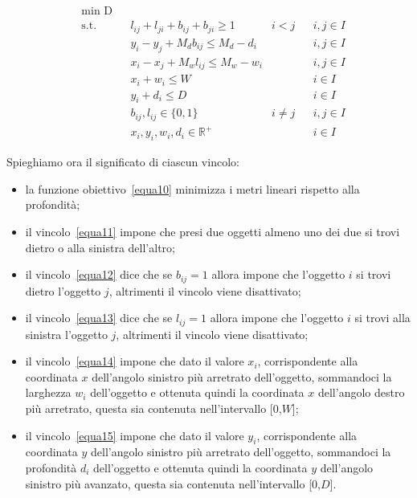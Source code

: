 \begin{align}
	& \underset{}{\text{min D}} \label{equa10}\\
	  & \text{s.t.} &   & l_{ij} + l_{ji} + b_{ij} + b_{ji} \geq 1      & i < j    &   & i,j \in I \label{equa11} \\
	  &             &   & y_i - y_j + M_d b_{ij} \leq M_d - d_i         &          &   & i,j \in I \label{equa12} \\
	  &             &   & x_i - x_j + M_w l_{ij} \leq M_w - w_i         &          &   & i,j \in I \label{equa13} \\
	  &             &   & x_i + w_i \leq W                              &          &   & i \in I   \label{equa14} \\
	  &             &   & y_i + d_i \leq D                              &          &   & i \in I   \label{equa15} \\
	  &             &   & b_{ij}, l_{ij} \in \{0,1\}                    & i \neq j &   & i,j \in I \label{equa16} \\
	  &             &   & x_{i}, y_{i}, w_{i}, d_{i} \in \mathbb{R}^{+} &          &   & i \in I  \label{equa17}  
\end{align}

Spieghiamo ora il significato di ciascun vincolo:
\begin{itemize}
	\item la funzione obiettivo~\eqref{equa10} minimizza i metri lineari rispetto alla profondità;
	\item il vincolo~\eqref{equa11} impone che presi due oggetti almeno uno dei due si trovi dietro o alla sinistra dell'altro;
	\item il vincolo~\eqref{equa12} dice che se $b_{ij} = 1$ allora impone che l'oggetto $i$ si trovi dietro l'oggetto $j$, altrimenti il vincolo viene disattivato;
	\item il vincolo~\eqref{equa13} dice che se $l_{ij} = 1$ allora impone che l'oggetto $i$ si trovi alla sinistra l'oggetto $j$, altrimenti il vincolo viene disattivato;
	\item il vincolo~\eqref{equa14} impone che dato il valore $x_i$, corrispondente alla coordinata $x$ dell'angolo sinistro più arretrato dell'oggetto, sommandoci la larghezza $w_i$ dell'oggetto e ottenuta quindi la coordinata $x$ dell'angolo destro più arretrato, questa sia contenuta nell'intervallo [0,$W$];
	\item il vincolo~\eqref{equa15} impone che dato il valore $y_i$, corrispondente alla coordinata $y$ dell'angolo sinistro più arretrato dell'oggetto, sommandoci la profondità $d_i$ dell'oggetto e ottenuta quindi la coordinata $y$ dell'angolo sinistro più avanzato, questa sia contenuta nell'intervallo [0,$D$].
\end{itemize}

